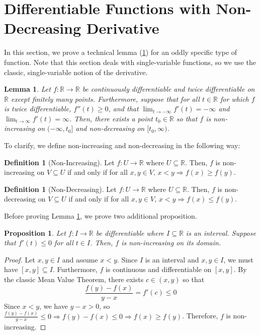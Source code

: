 \documentclass{article}
\renewcommand{\implies}{\Rightarrow}
\newcommand{\R}{\mathbb{R}}
\theoremstyle{plain} %
\numberwithin{thm}{section} %
\newtheorem{lemma}[thm]{Lemma}
\newtheorem{prop}[thm]{Proposition}
\theoremstyle{definition} %
\newtheorem{defn}[thm]{Definition}
\begin{document}
\section{Differentiable Functions with Non-Decreasing Derivative}\label{FunctionLemmasSection}

In this section, we prove a technical lemma (\ref{mainlemma}) for an oddly specific type of function. Note that this section deals with single-variable functions, so we use the classic, single-variable notion of the derivative.

\begin{lemma}
    \label{mainlemma}
    Let $f: \R \to \R$ be continuously differentiable and twice differentiable on $\R$ except finitely many points. Furthermore, suppose that for all $t \in \R$ for which $f$ is twice differentiable, $f''(t) \geq 0$, and that $\lim_{t \to -\infty} f'(t) = -\infty$ and $\lim_{t \to \infty} f'(t) = \infty$. Then, there exists a point $t_0 \in \R$ so that $f$ is non-increasing on $(-\infty, t_0]$ and non-decreasing on $[t_0, \infty)$.
\end{lemma}

To clarify, we define non-increasing and non-decreasing in the following way:

\begin{defn}[Non-Increasing]
    \label{nonincdef}
    Let $f: U \to \R$ where $U \subseteq \R$. Then, $f$ is non-increasing on $V \subseteq U$ if and only if for all $x, y \in V$, $x < y \implies f(x) \geq f(y)$.
\end{defn}

\begin{defn}[Non-Decreasing]
    \label{nondecdef}
    Let $f: U \to \R$ where $U \subseteq \R$. Then, $f$ is non-decreasing on $V \subseteq U$ if and only if for all $x, y \in V$, $x < y \implies f(x) \leq f(y)$.
\end{defn}

Before proving Lemma \ref{mainlemma}, we prove two additional proposition.

\begin{prop}
    \label{nonincprop}
    Let $f: I \to \R$ be differentiable where $I \subseteq \R$ is an interval. Suppose that $f'(t) \leq 0$ for all $t \in I$. Then, $f$ is non-increasing on its domain.
\end{prop}

\begin{proof}
Let $x, y \in I$ and assume $x < y$. Since $I$ is an interval and $x, y \in I$, we must have $[x, y] \subseteq I$. Furthermore, $f$ is continuous and differentiable on $[x, y]$. By the classic Mean Value Theorem, there exists $c \in (x, y)$ so that
\[
    \frac{f(y) - f(x)}{y - x} = f'(c) \leq 0
\]
Since $x < y$, we have $y - x > 0$, so $\frac{f(y) - f(x)}{y - x} \leq 0 \implies f(y) - f(x) \leq 0 \implies f(x) \geq f(y)$. Therefore, $f$ is non-increasing.

\end{proof}
\end{document}
